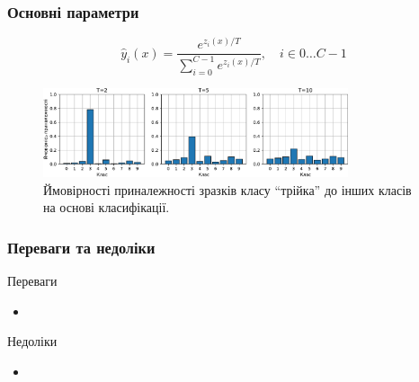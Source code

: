 \documentclass{beamer}
\numberwithin{equation}{section}
\begin{document}
	\begin{frame}
		\frametitle{Основні параметри}
		
		\begin{equation}
			\label{softmax-t}
			\hat{y}_i(x)=\frac{e^{z_{i}(x) / T}}{\sum\limits_{i=0}^{C-1} e^{z_{i}(x) / T}}, \quad i \in 0 \dots C-1
		\end{equation}
		
		\begin{figure}[h]
			\centering
			\includegraphics[width=0.8\textwidth]{../images/TvsP.pdf}
			
			\caption{Ймовірності приналежності зразків класу ``трійка'' до інших класів на основі класифікації.}
		\end{figure}
	\end{frame}


	\begin{frame}
		\frametitle{Переваги та недоліки}
		\begin{block}{Переваги}
			\begin{itemize}
				\item 
			\end{itemize}
		\end{block}
	
		\begin{block}{Недоліки}
			\begin{itemize}
				\item 
			\end{itemize}
		\end{block}
	\end{frame}
	
	
\end{document}
